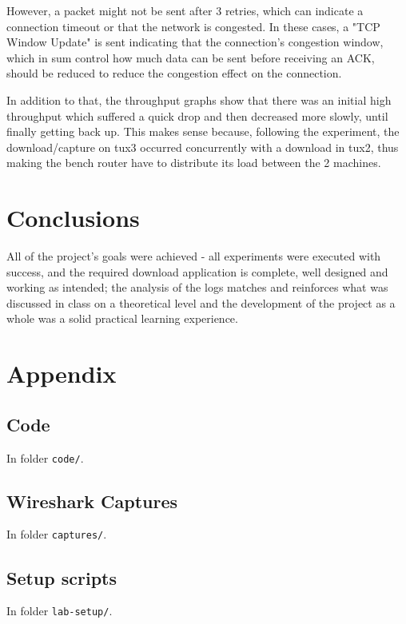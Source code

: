 \documentclass[11pt,a4paper,twocolumn]{article}
\begin{document}
However, a packet might not be sent after 3 retries, which can indicate a connection timeout or that the network is congested. In these cases, a "TCP Window Update" is sent indicating that the connection's congestion window, which in sum control how much data can be sent before receiving an ACK, should be reduced to reduce the congestion effect on the connection.

In addition to that, the throughput graphs show that there was an initial high throughput which suffered a quick drop and then decreased more slowly, until finally getting back up. This makes sense because, following the experiment, the download/capture on tux3 occurred concurrently with a download in tux2, thus making the bench router have to distribute its load between the 2 machines.

\section{Conclusions}

All of the project's goals were achieved - all experiments were executed with success, and the required download application is complete, well designed and working as intended; the analysis of the logs matches and reinforces what was discussed in class on a theoretical level and the development of the project as a whole was a solid practical learning experience.

\onecolumn
\appendix
\section{Appendix}

\subsection{Code}

\noindent In folder \lstinline{code/}.

\subsection{Wireshark Captures}

\noindent In folder \lstinline{captures/}.

\subsection{Setup scripts}

\noindent In folder \lstinline{lab-setup/}.
\end{document}
